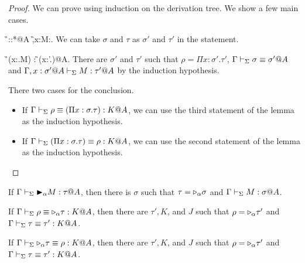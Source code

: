 \begin{proof}
    We can prove using induction on the derivation tree.
    We show a few main cases.

    \begin{rneqncase}{\TAbs{}}{
            \G\V \sigma::*@A  \G,x:\sigma@A\V M:\tau@A.
            }
            We can take $\sigma$ and $\tau$ as $\sigma'$ and $\tau'$ in the statement.
    \end{rneqncase}

    \begin{rneqncase}{\TConv{}}{
            \G \V (\lambda x:\sigma.M) : \rho@A {} \G \V \rho \E (\Pi x:\sigma'.\tau)@A.
            }
            There are $\sigma'$ and $\tau'$ such that
            $\rho = \Pi x:\sigma'.\tau'$, $\Gamma \vdash_\Sigma \sigma \equiv \sigma'@A$ and $\Gamma ,x:\sigma'@A\vdash_\Sigma M:\tau'@A$
            by the induction hypothesis.
    \end{rneqncase}

    \begin{rneqncase}{\QTRefl{}}{}
        There two cases for the conclusion.
        \begin{itemize}
            \item If $\Gamma \vdash_\Sigma \rho \equiv (\Pi x:\sigma.\tau) : K @A$,
                we can use the third statement of the lemma as the induction hypothesis.
            \item If $\Gamma \vdash_\Sigma (\Pi x:\sigma.\tau) \equiv \rho : K @A$,
                we can use the second statement of the lemma as the induction hypothesis.
        \end{itemize}
    \end{rneqncase}

\end{proof}

\begin{lemma}
    \begin{item}
    \item If $\G \V \TB_\alpha M : \tau@A$, then
        there is $\sigma$ such that $\tau = {\mathop{\triangleright}}_\alpha \sigma$ and $\G \V M : \sigma@A$.
    \item If $\Gamma \vdash_\Sigma \rho \equiv {\mathop{\triangleright}}_\alpha \tau : K @A$, then there are $\tau', K$, and $J$ such that
        $\rho = {\mathop{\triangleright}}_\alpha \tau'$ and $\Gamma \vdash_\Sigma \tau \equiv \tau' : K @A$.
    \item If $\Gamma \vdash_\Sigma {\mathop{\triangleright}}_\alpha \tau \equiv \rho : K @A$, then there are $\tau', K$, and $J$ such that
        $\rho = {\mathop{\triangleright}}_\alpha \tau'$ and $\Gamma \vdash_\Sigma \tau \equiv \tau' : K @A$.
    \end{item}
\end{lemma}

